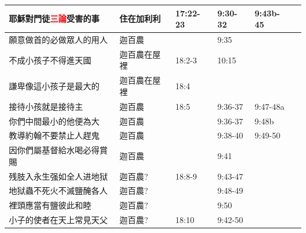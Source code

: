 \begin{table}[H]
\begin{tabular}{p{13.07em}|l|l|l|p{5.285em}|r}
\textbf{耶穌對門徒\textcolor{red}{三論}受害的事} & \multicolumn{1}{p{7.93em}|}{住在加利利} & \multicolumn{1}{p{5.285em}|}{17:22-23} & \multicolumn{1}{p{5.57em}|}{9:30-32} & 9:43b-45 &  \\ \midrule



願意做首的必做眾人的用人& \multicolumn{1}{p{7.93em}|}{迦百農} & \multicolumn{1}{p{5.285em}|}{} & \multicolumn{1}{p{5.57em}|}{9:35} &  &  \\ \midrule


不成小孩子不得進天國& \multicolumn{1}{p{7.93em}|}{迦百農在屋裡} & \multicolumn{1}{p{5.285em}|}{18:2-3} & \multicolumn{1}{p{5.57em}|}{10:15} & &  \\ \midrule

謙卑像這小孩子是最大的& \multicolumn{1}{p{7.93em}|}{迦百農在屋裡} & \multicolumn{1}{p{5.285em}|}{18:4} & \multicolumn{1}{p{5.57em}|}{} & &  \\ \midrule


接待小孩就是接待主& \multicolumn{1}{p{7.93em}|}{迦百農} & \multicolumn{1}{p{5.285em}|}{18:5} & \multicolumn{1}{p{5.57em}|}{9:36-37} & 9:47-48a &  \\ \midrule

你們中間最小的他便為大& \multicolumn{1}{p{7.93em}|}{迦百農} & \multicolumn{1}{p{5.285em}|}{} & \multicolumn{1}{p{5.57em}|}{9:36-37} & 9:48b &  \\ \midrule



教導約翰不要禁止人趕鬼& \multicolumn{1}{p{7.93em}|}{迦百農} &&\multicolumn{1}{p{5.57em}|}{9:38-40} & 9:49-50 &  \\\midrule

因你們屬基督給水喝必得賞賜& \multicolumn{1}{p{7.93em}|}{迦百農} &&\multicolumn{1}{p{5.57em}|}{9:41} &  &  \\\midrule


残肢入永生强如全人进地狱& \multicolumn{1}{p{7.93em}|}{迦百農?} &\multicolumn{1}{p{5.285em}|}{18:8-9}&9:43-47&  &  \\\midrule
地狱蟲不死火不滅鹽醃各人& \multicolumn{1}{p{7.93em}|}{迦百農?} &\multicolumn{1}{p{5.285em}|}{}&9:48-49&  &  \\\midrule
裡頭應當有鹽彼此和睦& \multicolumn{1}{p{7.93em}|}{迦百農?} &\multicolumn{1}{p{5.285em}|}{}&9:50&  &  \\\midrule

小子的使者在天上常見天父& \multicolumn{1}{p{7.93em}|}{迦百農?} &\multicolumn{1}{p{5.285em}|}{18:10}&9:42-50&  &  \\\midrule



\end{tabular}
\end{table}
